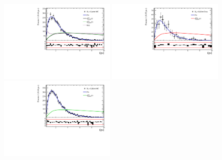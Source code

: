 \begin{figure}[h]
\includegraphics[height=!,width=0.49\textwidth]{figs/Acceptance/adaptive_N4/timeAccRatioFit_norm_mc_Run1_t1.pdf}
\includegraphics[height=!,width=0.49\textwidth]{figs/Acceptance/adaptive_N4/timeAccRatioFit_signal_B0_Run1_t1.pdf}
\includegraphics[height=!,width=0.49\textwidth]{figs/Acceptance/adaptive_N4/timeAccRatioFit_signal_mc_Run1_t1.pdf}
\caption{}
\label{fig:}
\end{figure}

